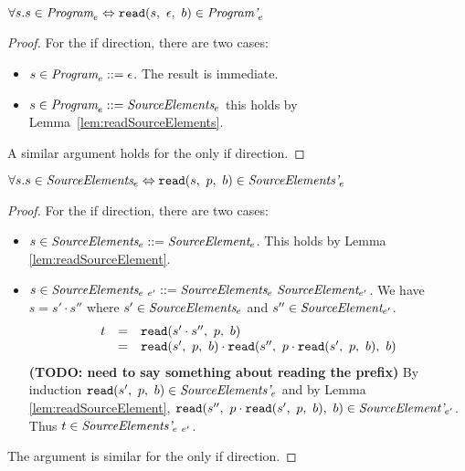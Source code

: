 \documentclass[preprint,10pt]{sigplanconf}
\begin{document}
\begin{theorem}\mbox{}

  \( \forall s. s \in \textit{Program}_{e} \Leftrightarrow 
  \texttt{read}(s,~\epsilon,~b) \in \textit{Program'}_{e} \)

\end{theorem}
\begin{proof}

  For the if direction, there are two cases:
  \begin{itemize}
  \item \( s \in \textit{Program}_{e} ::= \epsilon \). The result is immediate.

  \item \( s \in \textit{Program}_{e} ::= \textit{SourceElements}_{e} \)
    this holds by Lemma~\ref{lem:readSourceElements}.
  \end{itemize}

  A similar argument holds for the only if direction.
\end{proof}

\begin{lemma}\mbox{}

  \( \forall s. s \in \textit{SourceElements}_{e} \Leftrightarrow 
  \texttt{read}(s,~p,~b) \in \textit{SourceElements'}_{e} \)
\end{lemma}
\begin{proof}
  For the if direction, there are two cases:
  \begin{itemize}
  \item \( s \in \textit{SourceElements}_{e} ::=
    \textit{SourceElement}_{e} \). This holds by Lemma
    \ref{lem:readSourceElement}.
    
  \item \( s \in \textit{SourceElements}_{e~e'} ::=
    \textit{SourceElements}_{e}~\textit{SourceElement}_{e'} \). We have
    \( s = s' \cdot s'' \) where \( s' \in \textit{SourceElements}_{e}
    \) and \( s'' \in \textit{SourceElement}_{e'} \).
    \[
    \begin{array}{rcl}
      t &=& \texttt{read}(s'\cdot s'',~p,~b)
      \\
      &=& \texttt{read}(s',~p,~b)\cdot \texttt{read}(s'',~p \cdot \texttt{read}(s',~p,~b),~b)
    \end{array}
    \]
    \textbf{(TODO: need to say something about reading the prefix)}
    By induction \( \texttt{read}(s',~p,~b) \in \textit{SourceElements'}_{e} \)
    and by Lemma \ref{lem:readSourceElement}, \( \texttt{read}(s'',~p \cdot
      \texttt{read}(s',~p,~b),~b) \in \textit{SourceElement'}_{e'} \). Thus
    \( t \in \textit{SourceElements'}_{e~e'} \).
  \end{itemize}
  
  The argument is similar for the only if direction.
\end{proof}
\end{document}
